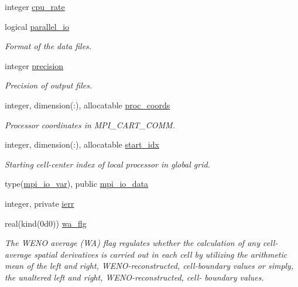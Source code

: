 \begin{DoxyCompactItemize}
integer \hyperlink{namespacem__global__parameters_aa513ad8900dd8de41a5bd8a17e7943c7}{cpu\+\_\+rate}
\item 
logical \hyperlink{namespacem__global__parameters_ac127ac2a9036e1cdb7e6c41159cacdfb}{parallel\+\_\+io}
\begin{DoxyCompactList}\small\item\em Format of the data files. \end{DoxyCompactList}\item 
integer \hyperlink{namespacem__global__parameters_a6ed5e5561c16f30a4010f6612877029d}{precision}
\begin{DoxyCompactList}\small\item\em Precision of output files. \end{DoxyCompactList}\item 
integer, dimension(\+:), allocatable \hyperlink{namespacem__global__parameters_a48dea2bc17c5e4465a444c926070ae9b}{proc\+\_\+coords}
\begin{DoxyCompactList}\small\item\em Processor coordinates in M\+P\+I\+\_\+\+C\+A\+R\+T\+\_\+\+C\+O\+MM. \end{DoxyCompactList}\item 
integer, dimension(\+:), allocatable \hyperlink{namespacem__global__parameters_a4bd117ae744eab60f3d681fd03d6e90d}{start\+\_\+idx}
\begin{DoxyCompactList}\small\item\em Starting cell-\/center index of local processor in global grid. \end{DoxyCompactList}\item 
type(\hyperlink{structm__derived__types_1_1mpi__io__var}{mpi\+\_\+io\+\_\+var}), public \hyperlink{namespacem__global__parameters_ad80f68aac31aa898ab2d7729f60e375f}{mpi\+\_\+io\+\_\+data}
\item 
integer, private \hyperlink{namespacem__global__parameters_a46461347b5094736adfa94ef005b49a6}{ierr}
\item 
real(kind(0d0)) \hyperlink{namespacem__global__parameters_ac4851cbb47e6541bfcf40706bd08eee6}{wa\+\_\+flg}
\begin{DoxyCompactList}\small\item\em The W\+E\+NO average (WA) flag regulates whether the calculation of any cell-\/ average spatial derivatives is carried out in each cell by utilizing the arithmetic mean of the left and right, W\+E\+N\+O-\/reconstructed, cell-\/boundary values or simply, the unaltered left and right, W\+E\+N\+O-\/reconstructed, cell-\/ boundary values. \end{DoxyCompactList}\item 

\end{DoxyCompactItemize}
